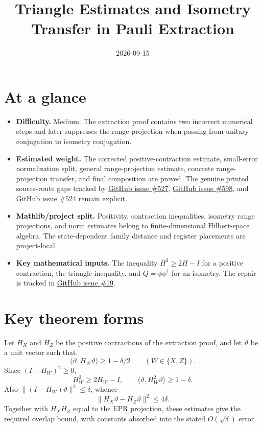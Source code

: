 \documentclass[11pt]{article}
\title{Triangle Estimates and Isometry Transfer in Pauli Extraction}
\author{}
\date{2026-09-15}
\renewcommand{\ghissue}[1]{%
  \href{https://github.com/Dengnifer/MIPStarRE-QPBT/issues/#1}{GitHub issue \##1}}
\begin{document}
\maketitle

\section{At a glance}

\begin{itemize}
  \item \textbf{Difficulty.} Medium.  The extraction proof contains two
  incorrect numerical steps and later suppresses the range projection when
  passing from unitary conjugation to isometry conjugation.
  \item \textbf{Estimated weight.} The corrected positive-contraction estimate,
  small-error normalization split, general range-projection estimate, concrete
  range-projection transfer, and final  composition are
  proved.  The genuine printed source-route gaps tracked by \ghissue{527},
  \ghissue{598}, and \ghissue{524} remain explicit.
  \item \textbf{Mathlib/project split.} Positivity, contraction inequalities,
  isometry range projections, and norm estimates belong to finite-dimensional
  Hilbert-space algebra.  The state-dependent family distance and register
  placements are project-local.
  \item \textbf{Key mathematical inputs.} The inequality
  $H^2\geq2H-I$ for a positive contraction, the triangle inequality, and
  $Q=\phi\phi^\dagger$ for an isometry.  The repair is tracked in
  \ghissue{19}.
\end{itemize}

\section{Key theorem forms}

Let $H_X$ and $H_Z$ be the positive contractions of the extraction proof, and
let $\vartheta$ be a unit vector such that
\[
  \langle\vartheta,H_W\vartheta\rangle\geq1-\delta/2
  \qquad (W\in\{X,Z\}).
\]
Since $(I-H_W)^2\geq0$,
\[
  H_W^2\geq2H_W-I,
  \qquad
  \langle\vartheta,H_W^2\vartheta\rangle\geq1-\delta.
\]
Also $\lVert(I-H_W)\vartheta\rVert^2\leq\delta$, whence
\[
  \lVert H_X\vartheta-H_Z\vartheta\rVert^2\leq4\delta.
\]
Together with $H_XH_Z$ equal to the EPR projection, these estimates give the
required overlap bound, with constants absorbed into the stated
$O(\sqrt\delta)$ error.
\end{document}
